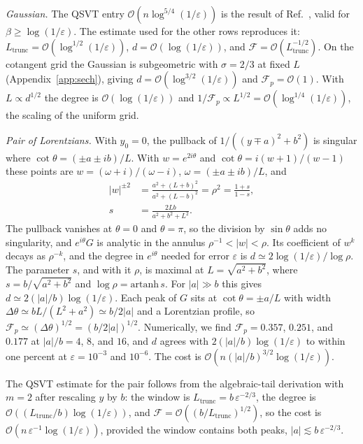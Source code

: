 \emph{Gaussian.}  The QSVT entry
$\mathcal{O}(n\log^{5/4}(1/\varepsilon))$ is the result of
Ref.~\cite[Thm.~2, Eq.~(6)]{McArdleGilyenBerta2025}, valid for
$\beta\ge\log(1/\varepsilon)$.  The estimate used for the other
rows reproduces it: $L_{\mathrm{trunc}}=
\mathcal{O}(\log^{1/2}(1/\varepsilon))$,
$d=\mathcal{O}(\log(1/\varepsilon))$, and
$\mathcal{F}=\mathcal{O}(L_{\mathrm{trunc}}^{-1/2})$.  On the
cotangent grid the Gaussian is subgeometric with $\sigma=2/3$ at
fixed $L$ (Appendix~\ref{app:sech}), giving
$d=\mathcal{O}(\log^{3/2}(1/\varepsilon))$ and
$\mathcal{F}_p=\mathcal{O}(1)$.  With $L\propto d^{1/2}$ the
degree is $\mathcal{O}(\log(1/\varepsilon))$ and
$1/\mathcal{F}_p\propto L^{1/2}=
\mathcal{O}(\log^{1/4}(1/\varepsilon))$, the scaling of the
uniform grid.

\emph{Pair of Lorentzians.}  With $y_0=0$, the pullback of
$1/((y\mp a)^2+b^2)$ is singular where
$\cot\theta=(\pm a\pm ib)/L$.  With $w=e^{2i\theta}$ and
$\cot\theta=i(w+1)/(w-1)$ these points are
$w=(\omega+i)/(\omega-i)$, $\omega=(\pm a\pm ib)/L$, and
\begin{equation}
	\begin{split}
		|w|^{\pm2}&=\frac{a^2+(L+b)^2}{a^2+(L-b)^2}=\rho^2
		=\frac{1+s}{1-s},\\
		s&=\frac{2Lb}{a^2+b^2+L^2}.
	\end{split}
\end{equation}
The pullback vanishes at $\theta=0$ and $\theta=\pi$, so the
division by $\sin\theta$ adds no singularity, and $e^{i\theta}G$ is
analytic in the annulus $\rho^{-1}<|w|<\rho$.  Its coefficient of
$w^k$ decays as $\rho^{-k}$, and the degree in $e^{i\theta}$ needed
for error $\varepsilon$ is
$d\simeq 2\log(1/\varepsilon)/\log\rho$.  The parameter $s$, and with it $\rho$,
is maximal at $L=\sqrt{a^2+b^2}$, where
$s=b/\sqrt{a^2+b^2}$ and $\log\rho=\mathrm{artanh}\,s$.  For
$|a|\gg b$ this gives $d\simeq 2(|a|/b)\log(1/\varepsilon)$.  Each
peak of $G$ sits at $\cot\theta=\pm a/L$ with width
$\Delta\theta\simeq bL/(L^2+a^2)\simeq b/2|a|$ and a Lorentzian
profile, so $\mathcal{F}_p\simeq(\Delta\theta)^{1/2}=
(b/2|a|)^{1/2}$.  Numerically, we find $\mathcal{F}_p=0.357$,
$0.251$, and $0.177$ at $|a|/b=4$, $8$, and $16$, and $d$ agrees with
$2(|a|/b)\log(1/\varepsilon)$ to within one percent at
$\varepsilon=10^{-3}$ and $10^{-6}$.  The cost is
$\mathcal{O}(n(|a|/b)^{3/2}\log(1/\varepsilon))$.

The QSVT
estimate for the pair follows from the algebraic-tail derivation with $m=2$
after rescaling $y$ by $b$: the window is
$L_{\mathrm{trunc}}=b\,\varepsilon^{-2/3}$, the degree is
$\mathcal{O}((L_{\mathrm{trunc}}/b)\log(1/\varepsilon))$, and
$\mathcal{F}=\mathcal{O}((b/L_{\mathrm{trunc}})^{1/2})$, so the cost
is $\mathcal{O}(n\,\varepsilon^{-1}\log(1/\varepsilon))$, provided
the window contains both peaks,
$|a|\lesssim b\,\varepsilon^{-2/3}$.

